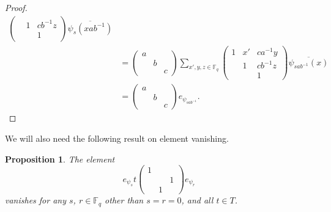 \documentclass[12pt,reqno]{amsart}
\newtheorem{prop}[thm]{Proposition}
\theoremstyle{definition}
\theoremstyle{remark}
\numberwithin{equation}{section}
\begin{document}
\begin{proof}
\begin{align*}
\begin{pmatrix}
            & 1 & cb^{-1}z\\
            & & 1
        \end{pmatrix} \overline{\psi_s(xab^{-1})}\\
        &= \begin{pmatrix}
            a & & \\
            & b &\\
            & & c
        \end{pmatrix} \sum_{x', y, z \in \mathbb{F}_q}
        \begin{pmatrix}
            1 & x' & ca^{-1}y\\
            & 1 & cb^{-1}z\\
            & & 1
        \end{pmatrix} \overline{\psi_{sab^{-1}}(x)}\\
        &= \begin{pmatrix}
            a & & \\
            & b &\\
            & & c
        \end{pmatrix} e_{\psi_{sab^{-1}}}.
    \end{align*}
\end{proof}

We will also need the following result on element vanishing.

\begin{prop}\label{g2is0}
    The element 
    \[
    e_{\psi_s} t \begin{pmatrix}
        1 & & \\
        & & 1\\
        & 1 &
    \end{pmatrix} e_{\psi_r}
    \]
    vanishes for any $s$, $r \in \mathbb{F}_q$ other than $s = r = 0$, and all $t \in T$.
\end{prop}
\end{document}
